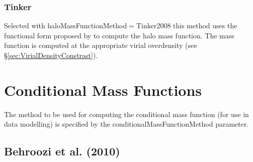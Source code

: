 \subsubsection{Tinker}

Selected with {\normalfont \ttfamily haloMassFunctionMethod}$=${\normalfont \ttfamily Tinker2008} this method uses the functional form proposed by \cite{tinker_towardhalo_2008} to compute the halo mass function. The mass function is computed at the appropriate virial overdensity (see \S\ref{sec:VirialDensityConstrast}).

\section{Conditional Mass Functions}

The method to be used for computing the conditional mass function (for use in data modelling) is specified by the {\normalfont \ttfamily conditionalMassFunctionMethod} parameter.

\subsection{Behroozi et al. (2010)}

